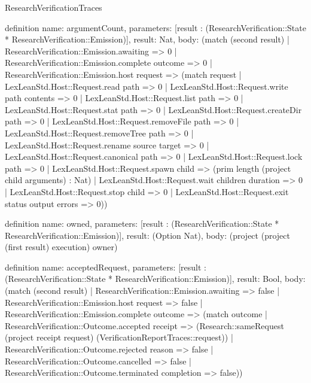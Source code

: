 \begin{lexlean}{ResearchVerificationTraces}
\begin{semanticmodule}
definition{
  name: argumentCount,
  parameters: [result : (ResearchVerification::State * ResearchVerification::Emission)],
  result: Nat,
  body: (match (second result) | ResearchVerification::Emission.awaiting => 0 | ResearchVerification::Emission.complete outcome => 0 | ResearchVerification::Emission.host request => (match request | LexLeanStd.Host::Request.read path => 0 | LexLeanStd.Host::Request.write path contents => 0 | LexLeanStd.Host::Request.list path => 0 | LexLeanStd.Host::Request.stat path => 0 | LexLeanStd.Host::Request.createDir path => 0 | LexLeanStd.Host::Request.removeFile path => 0 | LexLeanStd.Host::Request.removeTree path => 0 | LexLeanStd.Host::Request.rename source target => 0 | LexLeanStd.Host::Request.canonical path => 0 | LexLeanStd.Host::Request.lock path => 0 | LexLeanStd.Host::Request.spawn child => (prim length (project child arguments) : Nat) | LexLeanStd.Host::Request.wait children duration => 0 | LexLeanStd.Host::Request.stop child => 0 | LexLeanStd.Host::Request.exit status output errors => 0))
}

definition{
  name: owned,
  parameters: [result : (ResearchVerification::State * ResearchVerification::Emission)],
  result: (Option Nat),
  body: (project (project (first result) execution) owner)
}

definition{
  name: acceptedRequest,
  parameters: [result : (ResearchVerification::State * ResearchVerification::Emission)],
  result: Bool,
  body: (match (second result) | ResearchVerification::Emission.awaiting => false | ResearchVerification::Emission.host request => false | ResearchVerification::Emission.complete outcome => (match outcome | ResearchVerification::Outcome.accepted receipt => (Research::sameRequest (project receipt request) (VerificationReportTraces::request)) | ResearchVerification::Outcome.rejected reason => false | ResearchVerification::Outcome.cancelled => false | ResearchVerification::Outcome.terminated completion => false))
}


















































\end{semanticmodule}

\end{lexlean}
